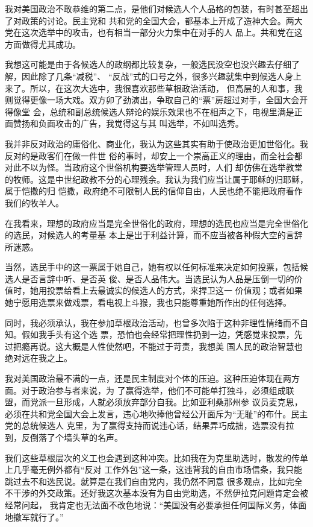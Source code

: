 ﻿\documentclass[11pt]{article}
\begin{document}
我对美国政治不敢恭维的第二点，是他们对候选人个人品格的包装，有时甚至超出了对政策的讨论。民主党和
共和党的全国大会，都基本上开成了造神大会。两大党在这次选举中的攻击，也有相当一部分火力集中在对手的人
品上。共和党在这方面做得尤其成功。

我想这可能是由于各候选人的政纲都比较复杂，一般选民没空也没兴趣去仔细了解，因此除了几条``减税''、
``反战''式的口号之外，很多兴趣就集中到候选人身上来了。所以，在这次大选中，我很喜欢那些草根政治活动，
但高层的人和事，我则觉得更像一场大戏。双方卯了劲演出，争取自己的``票''房超过对手，全国大会开得像堂
会，总统和副总统候选人辩论的娱乐效果也不在相声之下，电视里满是正面赞扬和负面攻击的广告，我觉得这与其
叫选举，不如叫选秀。

我并非反对政治的庸俗化、商业化，我认为这些其实有助于使政治更加世俗化。我反对的是政客们在做一件世
俗的事时，却安上一个崇高正义的理由，而全社会都对此不以为怪。当政府这个世俗机构要选举管理人员时，人们
却仿佛在选举教堂的牧师。这是中世纪政教不分的心理残余。我认为我们应当让属于耶稣的归耶稣，属于恺撒的归
恺撒，政府绝不可限制人民的信仰自由，人民也绝不能把政府看作我们的牧羊人。

在我看来，理想的政府应当是完全世俗化的政府，理想的选民也应当是完全世俗化的选民，对候选人的考量基
本上是出于利益计算，而不应当被各种假大空的言辞所迷惑。

当然，选民手中的这一票属于她自己，她有权以任何标准来决定如何投票，包括候选人是否言辞中听、是否英
俊、是否人品伟大。当选民认为人品是压倒一切的价值时，她用投票给看上去最诚实的候选人的方式，来捍卫这一
价值观；或者如果她宁愿用选票来做戏票，看电视上斗猴，我也只能尊重她所作出的任何选择。

同时，我必须承认，我在参加草根政治活动，也曾多次陷于这种非理性情绪而不自知。假如我手头有这个选
票，恐怕也会经常把理性扔到一边，凭感觉来投票，先过把瘾再说。这大概是人性使然吧，不能过于苛责，我想美
国人民的政治智慧也绝对远在我之上。


我对美国政治最不满的一点，还是民主制度对个体的压迫。这种压迫体现在两方面。对于政治参与者来说，为
了赢得选举，他们不可能单打独斗，必须组成联盟，而党派一旦形成，人就必须放弃部分自我。比如亚利桑那州参
议员麦克恩，必须在共和党全国大会上发言，违心地吹捧他曾经公开面斥为``无耻''的布什。民主党的总统候选人
克里，为了赢得支持而说违心话，结果弄巧成拙，选票没有拉到，反倒落了个墙头草的名声。

我们这些草根层次的义工也会遇到这种冲突。比如我在为克里助选时，散发的传单上几乎毫无例外都有``反对
工作外包''这一条，这违背我的自由市场信条，我只能跳过去不和选民说。就算是在我们自由党内，我仍然不同意
很多观点，比如完全不干涉的外交政策。还好我这次基本没有为自由党助选，不然伊拉克问题肯定会被经常问起，
我肯定也无法面不改色地说：``美国没有必要承担任何国际义务，体面地撤军就行了。''
\end{document}
